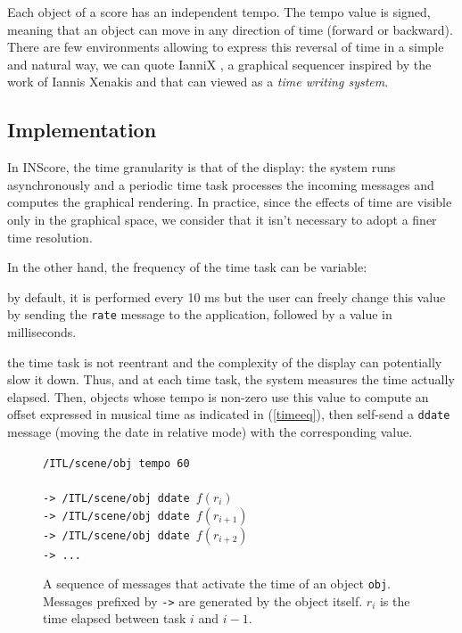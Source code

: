 \documentclass{article}
\newcommand{\OSC}[1]	{{\fontsize{8.5pt}{8pt} \selectfont\texttt{#1}}}
\let\olditemize\itemize
\let\oldenditemize\enditemize
\renewenvironment{itemize} 	{\olditemize \renewcommand{\labelitemi}{$\bullet$} \setlength{\itemsep}{0mm}}{\oldenditemize}
\newcommand{\sample}[1]		{\vspace{-0.2em}\begin{center}\colorbox{mygrey}{\begin{minipage}[t]{0.98\columnwidth} {\small \texttt{#1}}\end{minipage}}\end{center}}
\begin{document}
Each object of a score has an independent tempo. The tempo value is signed, meaning that an object can move in any direction of time (forward or backward). There are few environments allowing to express this reversal of time in a simple and natural way, we can quote IanniX \cite{coduys04}, a graphical sequencer inspired by the work of Iannis Xenakis and that can viewed as a \emph{time writing system}.


\subsection{Implementation}

In INScore, the time granularity is that of the display: the system runs asynchronously and a periodic time task processes the incoming messages and computes the graphical rendering. In practice, since the effects of time are visible only in the graphical space, we consider that it isn't necessary to adopt a finer time resolution.

In the other hand, the frequency of the time task can be variable:
\begin{itemize}
\item by default, it is performed every 10 ms but the user can freely change this value by sending the \OSC{rate} message to the application, followed by a value in milliseconds.
\item the time task is not reentrant and the complexity of the display can potentially slow it down.
\end{itemize}
Thus, and at each time task, the system measures the time actually elapsed. Then, objects whose tempo is non-zero use this value to compute an offset expressed in musical time as indicated in (\ref{timeeq}), then self-send a \OSC{ddate} message (moving the date in relative mode) with the corresponding value.

\begin{figure}[h]
   \centering
   \sample{/ITL/scene/obj tempo 60 \\
   \\
-> /ITL/scene/obj ddate $f(r_i)$ \\
-> /ITL/scene/obj ddate $f(r_{i+1})$ \\
-> /ITL/scene/obj ddate $f(r_{i+2})$ \\
-> ...
}
   \caption{A sequence of messages that activate the time of an object \OSC{obj}. Messages prefixed by \OSC{->} are generated by the object itself. $r_{i}$ is the time elapsed between task $i$ and $i-1$.}
   \label{fig:tempo}
\end{figure}
\end{document}
